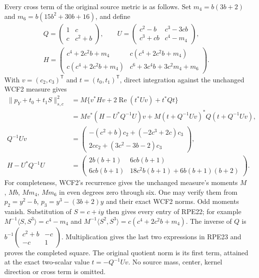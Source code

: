 Every cross term of the original source metric is as follows. Set
$m_4=b(3b+2)$ and $m_6=b(15b^2+30b+16)$, and define
\[
 \begin{gathered}
 Q=\begin{pmatrix}1&c\\c&c^2+b\end{pmatrix},\qquad
 U=\begin{pmatrix}
 c^2-b&c^3-3cb\\c^3+cb&c^4-m_4
 \end{pmatrix},\\
 H=\begin{pmatrix}
 c^4+2c^2b+m_4&c(c^4+2c^2b+m_4)\\
 c(c^4+2c^2b+m_4)&c^6+3c^4b+3c^2m_4+m_6
 \end{pmatrix}.
 \end{gathered}\tag{RPE22}
\]
With $v=(c_2,c_3)^{\mathsf T}$ and $t=(t_0,t_1)^{\mathsf T}$,
direct integration against the unchanged WCF2 measure gives
\[
 \begin{split}
 \|p_Y+t_0+t_1S\|_{s,c}^2
 &=M\{v^*Hv+2\operatorname{Re}(t^*Uv)+t^*Qt\}\\
 &=M v^*(H-U^*Q^{-1}U)v
       +M(t+Q^{-1}Uv)^*Q(t+Q^{-1}Uv),\\
 Q^{-1}Uv
 &=\begin{pmatrix}
 -(c^2+b)c_2+(-2c^3+2c)c_3\\
 2cc_2+(3c^2-3b-2)c_3
 \end{pmatrix},\\
 H-U^*Q^{-1}U
 &=\begin{pmatrix}
 2b(b+1)&6cb(b+1)\\
 6cb(b+1)&18c^2b(b+1)+6b(b+1)(b+2)
 \end{pmatrix}.
 \end{split}\tag{RPE23}
\]
For completeness, WCF2's recurrence gives the unchanged measure's
moments $M$, $Mb$, $Mm_4$, $Mm_6$ in even degrees zero through six.
One may verify them from
$p_2=y^2-b$, $p_3=y^3-(3b+2)y$ and their exact WCF2 norms.
Odd moments vanish. Substitution of $S=c+iy$ then gives every
entry of RPE22; for example
$M^{-1}\langle S,S^3\rangle=c^4-m_4$ and
$M^{-1}\langle S^2,S^3\rangle=c(c^4+2c^2b+m_4)$.
The inverse of $Q$ is
$b^{-1}\left(\begin{smallmatrix}c^2+b&-c\\-c&1\end{smallmatrix}\right)$.
Multiplication gives the last two expressions in RPE23 and proves
the completed square. The original quotient norm is its first term,
attained at the exact two-scalar value $t=-Q^{-1}Uv$.
No source mass, center, kernel direction or cross term is omitted.

